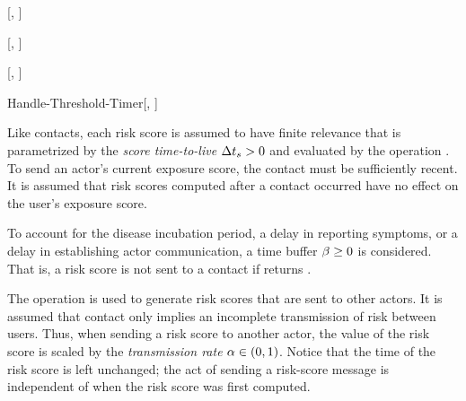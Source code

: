 %
\begin{function}{\nShouldReceive}[\vContact, \vScore]
\mReturn{\aContactThreshold < \aScoreValue}
\mState{\AND \aContactTime + \pTimeBuffer \geq \aScoreTime}
\mState{\AND \aContactName \notEquals \aScoreSender}
\end{function}
%
\begin{function}{\nUpdateThreshold}[\vContact, \vScore]
	\mState{\cStartThresholdTimer[\vContact, \vScore]}
\EndIf
\end{function}
%
\begin{function}{\nStartThresholdTimer}[\vContact, \vScore]
\mState{\aTimerName \assign \aContactName}
\mState{\cStartTimer[\vTimer, \cScoreTtl[\vScore]]}
\end{function}
%
\begin{function}{Handle-Threshold-Timer}[\vActor, \vTimer]
\mState{\vContact \assign \cSearch[\aActorContacts, \aTimerName]}
\mIf{\vContact \notEquals \nil}
	\mState{\vScore \assign \cCacheMax[\aActorCache, \aContactTime +
\pTimeBuffer]}
		\mState{\aContactThreshold \assign \pSendCoeff \cdot \aScoreValue}
		\mState{\cStartThresholdTimer[\vContact, \vScore]}
	\Else
	\EndIf
\EndIf
\end{function}
%
Like contacts, each risk score is assumed to have finite relevance that is parametrized by the \emph{score time-to-live} ${\Delta}t_s > 0$ and evaluated by the operation . To send an actor's current exposure score, the contact must be sufficiently recent. It is assumed that risk scores computed after a contact occurred have no effect on the user's exposure score.

To account for the disease incubation period, a delay in reporting symptoms, or a delay in establishing actor communication, a time buffer $\beta \geq 0$ is considered. That is, a risk score is not sent to a contact if  returns \false.

The  operation is used to generate risk scores that are sent to other actors. It is assumed that contact only implies an incomplete transmission of risk between users. Thus, when sending a risk score to another actor, the value of the risk score is scaled by the \emph{transmission rate} $\alpha \in (0, 1)$. Notice that the time of the risk score is left unchanged; the act of sending a risk-score message is independent of when the risk score was first computed.

